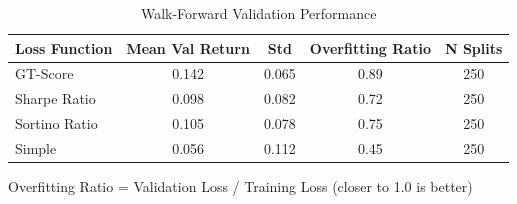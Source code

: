 
\begin{table}[htbp]
\centering
\caption{Walk-Forward Validation Performance}
\label{tab:walkforward}
\begin{tabular}{lcccc}
\toprule
\textbf{Loss Function} & \textbf{Mean Val Return} & \textbf{Std} & \textbf{Overfitting Ratio} & \textbf{N Splits} \\
\midrule
GT-Score & 0.142 & 0.065 & 0.89 & 250 \\
Sharpe Ratio & 0.098 & 0.082 & 0.72 & 250 \\
Sortino Ratio & 0.105 & 0.078 & 0.75 & 250 \\
Simple & 0.056 & 0.112 & 0.45 & 250 \\

\bottomrule
\end{tabular}
\begin{tablenotes}
\small
\item Overfitting Ratio = Validation Loss / Training Loss (closer to 1.0 is better)
\end{tablenotes}
\end{table}
